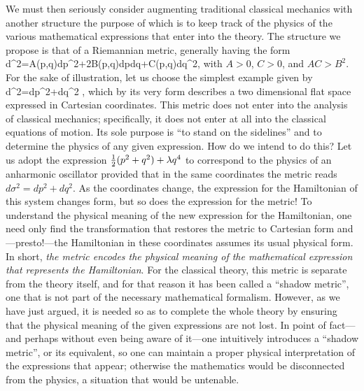 We must then seriously consider augmenting traditional classical mechanics 
with another structure the purpose of which is to keep track of the physics 
of the various mathematical expressions that enter into the theory. The 
structure we propose is that of a Riemannian metric, generally having the form
  \bn  d\sigma^2=A(p,q)\s dp^2+2B(p,q)\s dp\s dq+C(p,q)\s dq^2\;,  \en
with $A>0$, $C>0$, and $AC>B^2$. 
For the sake of illustration, let us choose the simplest example given by
  \bn  d\sigma^2=dp^2+dq^2 \;,  \en
which by its very form describes a two dimensional flat space expressed in
Cartesian coordinates. This metric does not enter into the analysis of 
classical mechanics; specifically, it does not enter at all into the 
classical equations of motion. Its sole purpose is ``to stand on the 
sidelines'' and to determine the physics of any given expression. How do 
we intend to do this? Let us adopt the expression $\textstyle{\frac{1}{2}}(p^2+q^2)+
\lambda q^4$ to correspond to the physics of an anharmonic oscillator 
provided that in the same coordinates the metric reads 
$d\sigma^2=dp^2+dq^2$. As the coordinates change, the expression for the 
Hamiltonian of this system changes form, but so does the expression for 
the metric! To understand the physical meaning of the new expression for 
the Hamiltonian, one need only find the transformation that restores the 
metric to Cartesian form and---presto!---the Hamiltonian in these 
coordinates assumes its usual physical form. In short, {\it the metric 
encodes the physical meaning of the mathematical expression that 
represents the Hamiltonian}. For the classical theory, this metric is 
separate from the theory itself, and for that reason it has been called 
a ``shadow metric'', one that is not part of the necessary mathematical 
formalism. However, as we have just argued, it is needed so as to complete 
the whole theory by ensuring that the physical meaning of the given 
expressions are not lost. In point of fact---and perhaps without even 
being aware of it---one intuitively introduces a ``shadow metric'', or 
its equivalent, so one can maintain a proper physical interpretation of 
the expressions that appear; otherwise the mathematics would be 
disconnected from the physics, a situation that would be untenable. 

